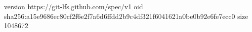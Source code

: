 version https://git-lfs.github.com/spec/v1
oid sha256:a15e9686ec80cf2f6e2f7a6d6ffdd2b9c4df321f6041621a0be0b92e6fe7ecc0
size 1048672
